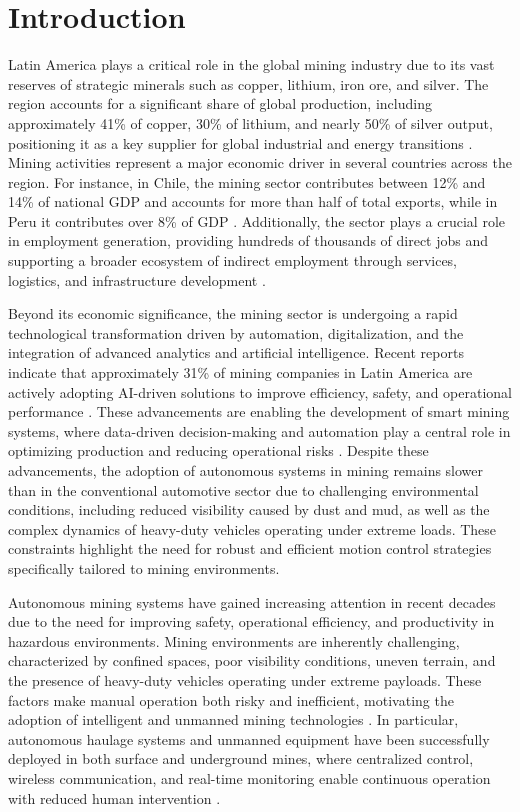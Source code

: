 \documentclass{ifacconf}
\begin{document}
\section{Introduction}

Latin America plays a critical role in the global mining industry due to its vast reserves of strategic minerals such as copper, lithium, iron ore, and silver. The region accounts for a significant share of global production, including approximately 41\% of copper, 30\% of lithium, and nearly 50\% of silver output, positioning it as a key supplier for global industrial and energy transitions \citep{ref1}. Mining activities represent a major economic driver in several countries across the region. For instance, in Chile, the mining sector contributes between 12\% and 14\% of national GDP and accounts for more than half of total exports, while in Peru it contributes over 8\% of GDP \citep{ref2,ref3}. Additionally, the sector plays a crucial role in employment generation, providing hundreds of thousands of direct jobs and supporting a broader ecosystem of indirect employment through services, logistics, and infrastructure development \citep{ref4}.

Beyond its economic significance, the mining sector is undergoing a rapid technological transformation driven by automation, digitalization, and the integration of advanced analytics and artificial intelligence. Recent reports indicate that approximately 31\% of mining companies in Latin America are actively adopting AI-driven solutions to improve efficiency, safety, and operational performance \citep{ref5}. These advancements are enabling the development of smart mining systems, where data-driven decision-making and automation play a central role in optimizing production and reducing operational risks \citep{ref6}. Despite these advancements, the adoption of autonomous systems in mining remains slower than in the conventional automotive sector due to challenging environmental conditions, including reduced visibility caused by dust and mud, as well as the complex dynamics of heavy-duty vehicles operating under extreme loads. These constraints highlight the need for robust and efficient motion control strategies specifically tailored to mining environments.

Autonomous mining systems have gained increasing attention in recent decades due to the need for improving safety, operational efficiency, and productivity in hazardous environments. Mining environments are inherently challenging, characterized by confined spaces, poor visibility conditions, uneven terrain, and the presence of heavy-duty vehicles operating under extreme payloads. These factors make manual operation both risky and inefficient, motivating the adoption of intelligent and unmanned mining technologies \cite{ref1}. In particular, autonomous haulage systems and unmanned equipment have been successfully deployed in both surface and underground mines, where centralized control, wireless communication, and real-time monitoring enable continuous operation with reduced human intervention \cite{refIntelligentMining}.
\end{document}

